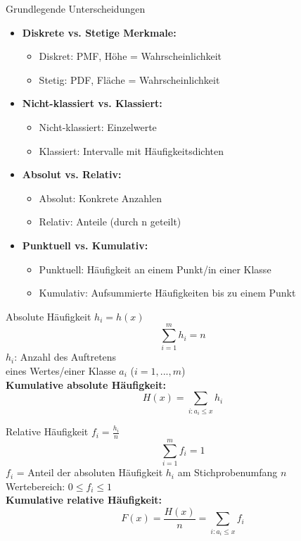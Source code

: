 \begin{definition}{Grundlegende Unterscheidungen}
\begin{itemize}
    \item \textbf{Diskrete vs. Stetige Merkmale:}
    \begin{itemize}
        \item Diskret: PMF, Höhe = Wahrscheinlichkeit
        \item Stetig: PDF, Fläche = Wahrscheinlichkeit
    \end{itemize}
    \item \textbf{Nicht-klassiert vs. Klassiert:}
    \begin{itemize}
        \item Nicht-klassiert: Einzelwerte
        \item Klassiert: Intervalle mit Häufigkeitsdichten
    \end{itemize}
    \item \textbf{Absolut vs. Relativ:}
    \begin{itemize}
        \item Absolut: Konkrete Anzahlen
        \item Relativ: Anteile (durch n geteilt)
    \end{itemize}
    \item \textbf{Punktuell vs. Kumulativ:}
    \begin{itemize}
        \item Punktuell: Häufigkeit an einem Punkt/in einer Klasse
        \item Kumulativ: Aufsummierte Häufigkeiten bis zu einem Punkt
    \end{itemize}
\end{itemize}
\end{definition}

\begin{minipage}[t]{0.5\columnwidth}
\begin{theorem}{Absolute Häufigkeit}
$h_i = h(x)$
$$\sum_{i=1}^m h_i = n$$
$h_i$: Anzahl des Auftretens\\ eines Wertes/einer Klasse $a_i$ ($i = 1,...,m$)
\vspace{2mm}\\
\textcolor{frog}{\textbf{Kumulative absolute Häufigkeit:}}
$$H(x) = \sum_{i:a_i\leq x} h_i$$
\end{theorem}
\end{minipage}
\begin{minipage}[t]{0.5\columnwidth}
\begin{theorem}{Relative Häufigkeit}
    $f_i = \frac{h_i}{n}$
    $$\sum_{i=1}^m f_i = 1$$
$f_i$ = Anteil der absoluten Häufigkeit $h_i$ am Stichprobenumfang $n$\\
Wertebereich: $0 \leq f_i \leq 1$
\vspace{2mm}\\
\textcolor{frog}{\textbf{Kumulative relative Häufigkeit:}}
$$F(x) = \frac{H(x)}{n} = \sum_{i:a_i\leq x} f_i$$
\end{theorem}
\end{minipage}


